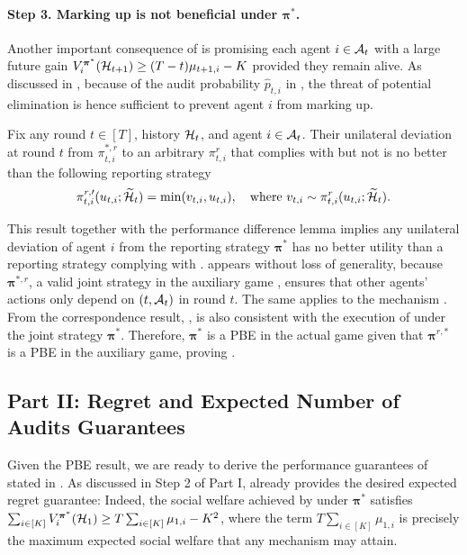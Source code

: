 \paragraph{Step 3. Marking up is not beneficial under $\bm\pi^\ast$.}
Another important consequence of  is promising each agent $i\in\mathcal{A}_t$ with a large future gain $V_i^{\bm \pi^\ast}(\mathcal{H}_{t+1})\ge (T-t)\mu_{t+1,i}-K$ provided they remain alive. As discussed in , because of the audit probability $\hat p_{t,i}$ in \mechname, the threat of potential elimination is hence sufficient to prevent agent $i$ from marking up.
\begin{lemma}\label{lem:min report with u is good}
Fix any round $t\in [T]$, history $\mathcal{H}_t$, and agent $i\in \mathcal{A}_t$. Their unilateral deviation at round $t$ from $\pi^{\ast,r}_{t,i}$ to an arbitrary $\pi^r_{t,i}$ that complies with  but not  is no better than the following reporting strategy
\begin{equation*}
\pi_{t,i}^{r,\prime}(u_{t,i};\widetilde {\mathcal{H}}_t)=\min(v_{t,i},u_{t,i}),\quad \text{where }v_{t,i}\sim \pi^r_{t,i}(u_{t,i};\widetilde {\mathcal{H}}_t).
\end{equation*}
\end{lemma}
This result together with the performance difference lemma \citep{kakade2002approximately} implies any unilateral deviation of agent $i$ from the reporting strategy $\bm\pi^\ast$ has no better utility than a reporting strategy complying with .  appears without loss of generality, because $\bm \pi^{\ast,r}$, a valid joint strategy in the auxiliary game , ensures that other agents' actions only depend on $(t,\mathcal{A}_t)$ in round $t$. The same applies to the mechanism \mechname.
From the correspondence result, ,  is also consistent with the execution of \mechname under the joint strategy $\bm\pi^\ast$.
Therefore, $\bm \pi^\ast$ is a PBE in the actual game given that $\bm \pi^{r,\ast}$ is a PBE in the auxiliary game, proving .

\subsection{Part II: Regret and Expected Number of Audits Guarantees}
Given the PBE result, we are ready to derive the performance guarantees of \mechname stated in .
As discussed in Step 2 of Part I,  already provides the desired expected regret guarantee: Indeed, the social welfare achieved by \mechname under $\bm\pi^\ast$ satisfies $\sum_{i\in[K]} V_i^{\bm\pi^\ast} (\mathcal{H}_1) \geq T\sum_{i\in[K]}\mu_{1,i} - K^2$, where the term $T\sum_{i\in[K]}\mu_{1,i}$ is precisely the maximum expected social welfare that any mechanism may attain.


